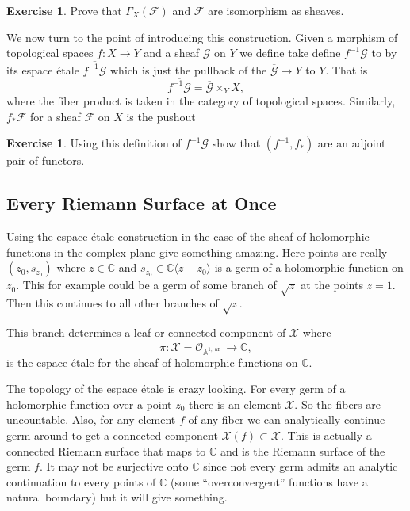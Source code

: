 \documentclass[12pt]{book}
\numberwithin{equation}{section}
\theoremstyle{definition}
\newtheorem{exercise}[theorem]{Exercise}
\theoremstyle{remark}
\newcommand{\CC}{\mathbb{C}}
\renewcommand{\AA}{\mathbb{A}}
\newcommand{\Ocal}{\mathcal{O}}
\newcommand{\Fcal}{\mathcal{F}}
\newcommand{\Gcal}{\mathcal{G}}
\newcommand{\an}{\operatorname{an}}
\begin{document}
\begin{exercise}
	Prove that $\Gamma_X(\mathcal{F})$ and $\Fcal$ are isomorphism as sheaves. 
\end{exercise}

We now turn to the point of introducing this construction. 
Given a morphism of topological spaces $f:X\to Y$ and a sheaf $\Gcal$ on $Y$ we define take define $f^{-1}\Gcal$ to by its espace \'etale $\overline{f^{-1}\Gcal}$ which is just the pullback of the $\overline{\Gcal}\to Y$ to $Y$.
That is 
$$ \overline{f^{-1}\Gcal} = \overline{\Gcal} \times_Y X,$$
where the fiber product is taken in the category of topological spaces. 
Similarly, $f_*\Fcal$ for a sheaf $\Fcal$ on $X$ is the pushout 

\begin{exercise}
	Using this definition of $f^{-1}\Gcal$ show that $(f^{-1},f_*)$ are an adjoint pair of functors. 
\end{exercise}


\subsection{Every Riemann Surface at Once}
Using the espace \'etale construction in the case of the sheaf of holomorphic functions in the complex plane give something amazing. 
Here points are really $(z_0,s_{z_0})$ where $z\in \CC$ and $s_{z_0} \in \CC\langle z-z_0\rangle$ is a germ of a holomorphic function on $z_0$.
This for example could be a germ of some branch of $\sqrt{z}$ at the points $z=1$. 
Then this continues to all other branches of $\sqrt{z}$. 

This branch determines a leaf or connected component of $\mathcal{X}$ where 
$$ \pi: \mathcal{X} =\overline{ \Ocal_{\AA^{1,\an}} } \to \CC,$$
is the espace \'etale for the sheaf of holomorphic functions on $\CC$. 

The topology of the espace \'etale is crazy looking. 
For every germ of a holomorphic function over a point $z_0$ there is an element $\mathcal{X}$. 
So the fibers are uncountable. 
Also, for any element $f$ of any fiber we can analytically continue germ around to get a connected component $\mathcal{X}(f) \subset \mathcal{X}$. 
This is actually a connected Riemann surface that maps to $\CC$ and is the Riemann surface of the germ $f$.
It may not be surjective onto $\CC$ since not every germ admits an analytic continuation to every points of $\CC$ (some ``overconvergent'' functions have a natural boundary) but it will give something. 
\end{document}
